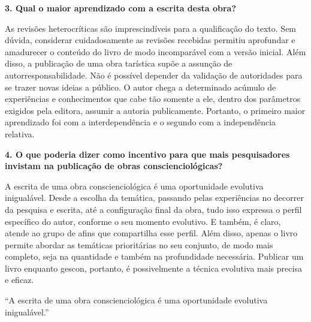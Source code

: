 \documentclass{gescons}
\begin{document}
\begin{multicols}{2}
\textbf{3.       Qual o maior aprendizado com a escrita desta obra?}

As revisões heterocríticas são imprescindíveis para a qualificação do texto. Sem dúvida, considerar cuidadosamente as revisões recebidas permitiu aprofundar e amadurecer o conteúdo do livro de modo incomparável com a versão inicial. Além disso, a publicação de uma obra tarística supõe a assunção de autorresponsabilidade. Não é possível depender da validação de autoridades para se trazer novas ideias a público. O autor chega a determinado acúmulo de experiências e conhecimentos que cabe tão somente a ele, dentro dos parâmetros exigidos pela editora, assumir a autoria publicamente. Portanto, o primeiro maior aprendizado foi com a interdependência e o segundo com a independência relativa.


\textbf{4.       O que poderia dizer como incentivo para que mais pesquisadores invistam na publicação de obras conscienciológicas?}

A escrita de uma obra conscienciológica é uma oportunidade evolutiva inigualável. Desde a escolha da temática, passando pelas experiências no decorrer da pesquisa e escrita, até a configuração final da obra, tudo isso expressa o perfil específico do autor, conforme o seu momento evolutivo. E também, é claro, atende ao grupo de afins que compartilha esse perfil. Além disso, apenas o livro permite abordar as temáticas prioritárias no seu conjunto, de modo mais completo, seja na quantidade e também na profundidade necessária. Publicar um livro enquanto gescon, portanto, é possivelmente a técnica evolutiva mais precisa e eficaz.

\begin{pullquote}
``A escrita de uma obra conscienciológica é uma oportunidade evolutiva inigualável.''
\end{pullquote}

        
    \end{multicols}
\end{document}
